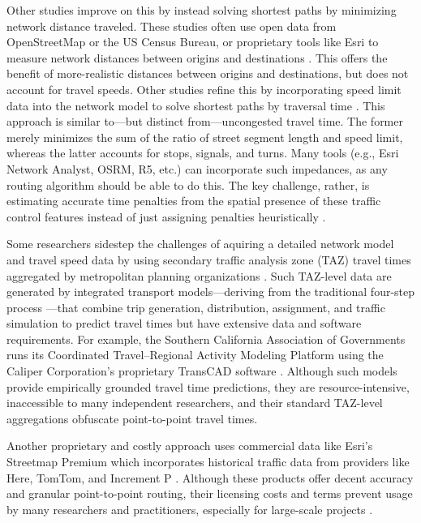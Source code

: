 \documentclass[12pt,letterpaper]{article} %
\begin{document}
Other studies improve on this by instead solving shortest paths by minimizing network distance traveled. These studies often use open data from OpenStreetMap or the US Census Bureau, or proprietary tools like Esri to measure network distances between origins and destinations \citep[e.g.,][]{mckenzie2020urban, jiao2021measuring, nicoletti2023disadvantaged, logan2019evaluating, tsou2005accessibility}. This offers the benefit of more-realistic distances between origins and destinations, but does not account for travel speeds. Other studies refine this by incorporating speed limit data into the network model to solve shortest paths by traversal time \citep{kuai2017examining,williams2020parks,he2020evaluating,salonen2013modelling,scott2008role,neutens2010equity,wang2013planning}. This approach is similar to---but distinct from---uncongested travel time. The former merely minimizes the sum of the ratio of street segment length and speed limit, whereas the latter accounts for stops, signals, and turns. Many tools (e.g., Esri Network Analyst, OSRM, R5, etc.) can incorporate such impedances, as any routing algorithm should be able to do this. The key challenge, rather, is estimating accurate time penalties from the spatial presence of these traffic control features instead of just assigning penalties heuristically \citep[e.g.,][]{yiannakoulias2013estimating}.

Some researchers sidestep the challenges of aquiring a detailed network model and travel speed data by using secondary traffic analysis zone (TAZ) travel times aggregated by metropolitan planning organizations \citep[e.g.,][]{grengs2010intermetropolitan, shin2020disparities, yan2021toward}. Such TAZ-level data are generated by integrated transport models---deriving from the traditional four-step process \citep{johnston_urban_2004}---that combine trip generation, distribution, assignment, and traffic simulation to predict travel times but have extensive data and software requirements. For example, the Southern California Association of Governments runs its Coordinated Travel–Regional Activity Modeling Platform using the Caliper Corporation's proprietary TransCAD software \citep{scag_transportation_models}. Although such models provide empirically grounded travel time predictions, they are resource-intensive, inaccessible to many independent researchers, and their standard TAZ-level aggregations obfuscate point-to-point travel times.

Another proprietary and costly approach uses commercial data like Esri's Streetmap Premium which incorporates historical traffic data from providers like Here, TomTom, and Increment P \citep[e.g.,][]{lin2021impact}. Although these products offer decent accuracy and granular point-to-point routing, their licensing costs and terms prevent usage by many researchers and practitioners, especially for large-scale projects \citep{delmelle2019travel,fu2023comparative}.
\end{document}
